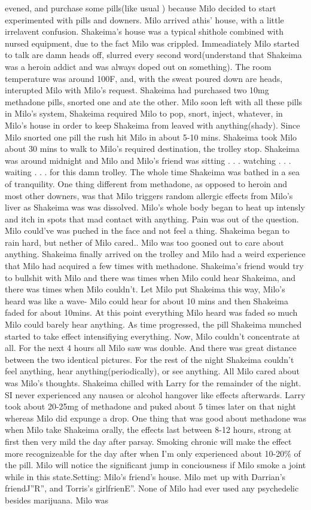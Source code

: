 \documentclass[12pt]{book}
\begin{document}
evened, and purchase some pills(like usual ) because Milo decided to start experimented with pills and downers. Milo arrived athis' house, with a little irrelavent confusion. Shakeima's house was a typical shithole combined with nursed equipment, due to the fact Milo was crippled. Immeadiately Milo started to talk are damn heads off, slurred every second word(understand that Shakeima was a heroin addict and was always doped out on something). The room temperature was around 100F, and, with the sweat poured down are heads, interupted Milo with Milo's request. Shakeima had purchased two 10mg methadone pills, snorted one and ate the other. Milo soon left with all these pills in Milo's system, Shakeima required Milo to pop, snort, inject, whatever, in Milo's house in order to keep Shakeima from leaved with anything(shady). Since Milo snorted one pill the rush hit Milo in about 5-10 mins. Shakeima took Milo about 30 mins to walk to Milo's required destination, the trolley stop. Shakeima was around midnight and Milo and Milo's friend was sitting . . .  watching . . .  waiting . . .  for this damn trolley. The whole time Shakeima was bathed in a sea of tranquility. One thing different from methadone, as opposed to heroin and most other downers, was that Milo triggers random allergic effects from Milo's liver as Shakeima was was dissolved. Milo's whole body began to heat up intensly and itch in spots that mad contact with anything. Pain was out of the question. Milo could've was puched in the face and not feel a thing. Shakeima began to rain hard, but nether of Milo cared.. Milo was too gooned out to care about anything. Shakeima finally arrived on the trolley and Milo had a weird experience that Milo had acquired a few times with methadone. Shakeima's friend would try to bullshit with Milo and there was times when Milo could hear Shakeima, and there was times when Milo couldn't. Let Milo put Shakeima this way, Milo's heard was like a wave- Milo could hear for about 10 mins and then Shakeima faded for about 10mins. At this point everything Milo heard was faded so much Milo could barely hear anything. As time progressed, the pill Shakeima munched started to take effect intensifiying everything. Now, Milo couldn't concentrate at all. For the next 4 hours all Milo saw was double. And there was great distance between the two identical pictures. For the rest of the night Shakeima couldn't feel anything, hear anything(periodically), or see anything. All Milo cared about was Milo's thoughts. Shakeima chilled with Larry for the remainder of the night. SI never experienced any nausea or alcohol hangover like effects afterwards. Larry took about 20-25mg of methadone and puked about 5 times later on that night whereas Milo did expunge a drop. One thing that was good about methadone was when Milo take Shakeima orally, the effects last between 8-12 hours, strong at first then very mild the day after parsay. Smoking chronic will make the effect more recognizeable for the day after when I'm only experienced about 10-20\% of the pill. Milo will notice the significant jump in conciousness if Milo smoke a joint while in this state.Setting: Milo's friend's house. Milo met up with Darrian's friendJ''R'', and Torris's girlfrienE''. None of Milo had ever used any psychedelic besides marijuana. Milo was 
\end{document}
